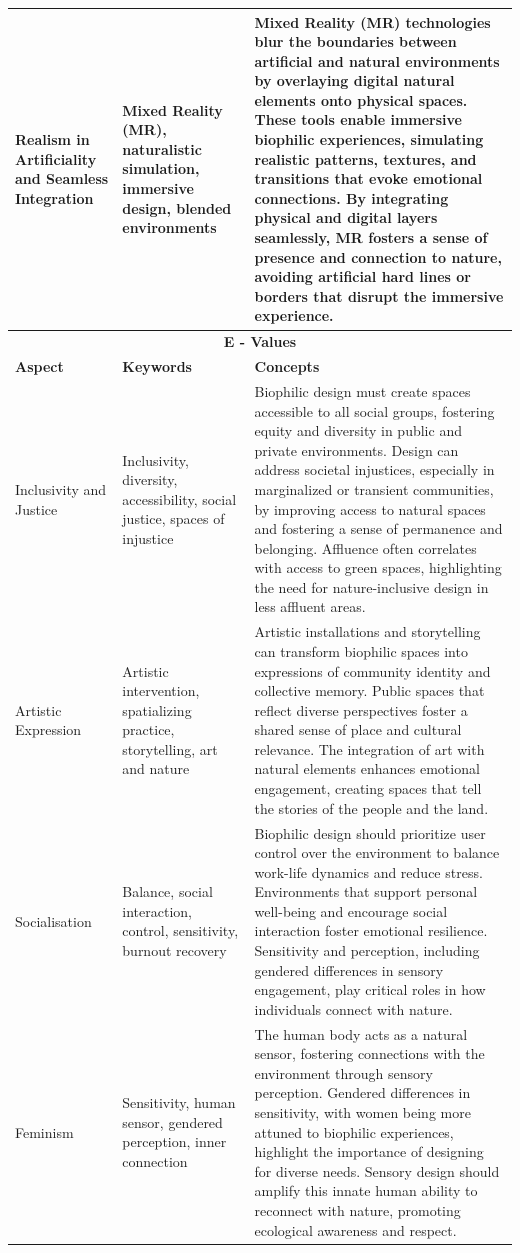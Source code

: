 \begin{longtable}{|p{3cm}|p{3.5cm}|p{7.5cm}|}
Realism in Artificiality and Seamless Integration & Mixed Reality (MR), naturalistic simulation, immersive design, blended environments & Mixed Reality (MR) technologies blur the boundaries between artificial and natural environments by overlaying digital natural elements onto physical spaces. These tools enable immersive biophilic experiences, simulating realistic patterns, textures, and transitions that evoke emotional connections. By integrating physical and digital layers seamlessly, MR fosters a sense of presence and connection to nature, avoiding artificial hard lines or borders that disrupt the immersive experience. \\ \hline


\multicolumn{3}{|c|}{\cellcolor[HTML]{E8F5E9}\textbf{E - Values}} \\ \hline
\textbf{Aspect} & \textbf{Keywords} & \textbf{Concepts} \\
\hline
Inclusivity and Justice & Inclusivity, diversity, accessibility, social justice, spaces of injustice & Biophilic design must create spaces accessible to all social groups, fostering equity and diversity in public and private environments. Design can address societal injustices, especially in marginalized or transient communities, by improving access to natural spaces and fostering a sense of permanence and belonging. Affluence often correlates with access to green spaces, highlighting the need for nature-inclusive design in less affluent areas. \\
\hline
Artistic Expression & Artistic intervention, spatializing practice, storytelling, art and nature & Artistic installations and storytelling can transform biophilic spaces into expressions of community identity and collective memory. Public spaces that reflect diverse perspectives foster a shared sense of place and cultural relevance. The integration of art with natural elements enhances emotional engagement, creating spaces that tell the stories of the people and the land. \\
\hline
Socialisation & Balance, social interaction, control, sensitivity, burnout recovery & Biophilic design should prioritize user control over the environment to balance work-life dynamics and reduce stress. Environments that support personal well-being and encourage social interaction foster emotional resilience. Sensitivity and perception, including gendered differences in sensory engagement, play critical roles in how individuals connect with nature. \\
\hline
Feminism & Sensitivity, human sensor, gendered perception, inner connection & The human body acts as a natural sensor, fostering connections with the environment through sensory perception. Gendered differences in sensitivity, with women being more attuned to biophilic experiences, highlight the importance of designing for diverse needs. Sensory design should amplify this innate human ability to reconnect with nature, promoting ecological awareness and respect. \\

\end{longtable}
